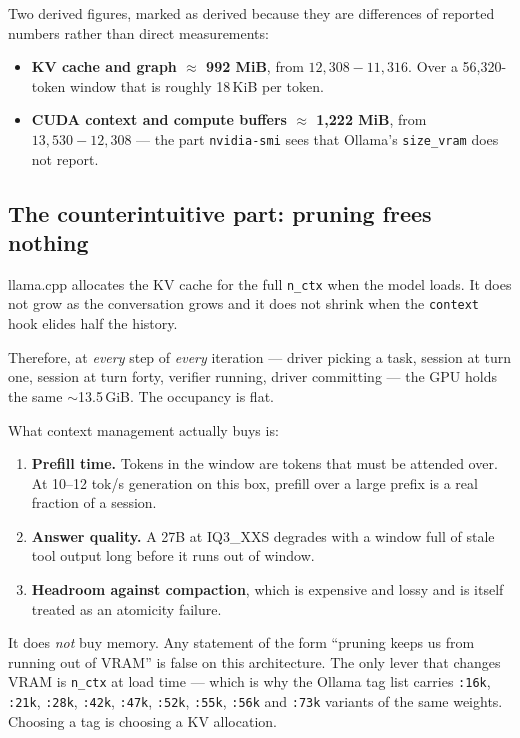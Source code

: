 \documentclass[11pt,a4paper]{article}
\begin{document}
Two derived figures, marked as derived because they are differences of reported
numbers rather than direct measurements:

\begin{itemize}[leftmargin=1.5em]
  \item \textbf{KV cache and graph $\approx$ 992 MiB}, from
  $12{,}308 - 11{,}316$. Over a 56{,}320-token window that is roughly
  18\,KiB per token.
  \item \textbf{CUDA context and compute buffers $\approx$ 1{,}222 MiB}, from
  $13{,}530 - 12{,}308$ --- the part \texttt{nvidia-smi} sees that Ollama's
  \texttt{size\_vram} does not report.
\end{itemize}

\subsection{The counterintuitive part: pruning frees nothing}

llama.cpp allocates the KV cache for the full \texttt{n\_ctx} when the model
loads. It does not grow as the conversation grows and it does not shrink when
the \texttt{context} hook elides half the history.

Therefore, at \emph{every} step of \emph{every} iteration --- driver picking a
task, session at turn one, session at turn forty, verifier running, driver
committing --- the GPU holds the same $\sim$13.5\,GiB. The occupancy is flat.

What context management actually buys is:

\begin{enumerate}[leftmargin=1.5em]
  \item \textbf{Prefill time.} Tokens in the window are tokens that must be
  attended over. At 10--12 tok/s generation on this box, prefill over a large
  prefix is a real fraction of a session.
  \item \textbf{Answer quality.} A 27B at IQ3\_XXS degrades with a window full
  of stale tool output long before it runs out of window.
  \item \textbf{Headroom against compaction}, which is expensive and lossy and
  is itself treated as an atomicity failure.
\end{enumerate}

It does \emph{not} buy memory. Any statement of the form ``pruning keeps us from
running out of VRAM'' is false on this architecture. The only lever that changes
VRAM is \texttt{n\_ctx} at load time --- which is why the Ollama tag list carries
\texttt{:16k}, \texttt{:21k}, \texttt{:28k}, \texttt{:42k}, \texttt{:47k},
\texttt{:52k}, \texttt{:55k}, \texttt{:56k} and \texttt{:73k} variants of the
same weights. Choosing a tag is choosing a KV allocation.
\end{document}
